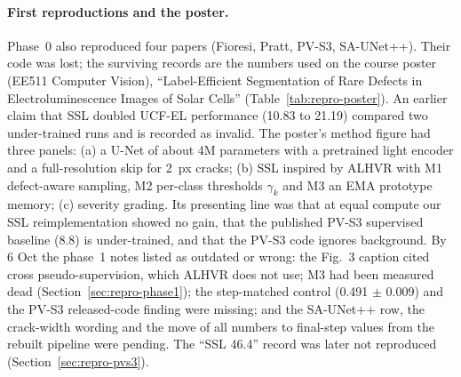 \paragraph{First reproductions and the poster.} Phase~0 also reproduced four papers (Fioresi, Pratt, PV-S3, SA-UNet++). Their code was
lost; the surviving records are the numbers used on the course poster (EE511 Computer Vision), ``Label-Efficient Segmentation of
Rare Defects in Electroluminescence Images of Solar Cells'' (Table~\ref{tab:repro-poster}). An earlier claim that SSL doubled UCF-EL
performance (10.83 to 21.19) compared two under-trained runs and is recorded as invalid. The poster's method figure had three panels: (a) a
U-Net of about 4M parameters with a pretrained light encoder and a full-resolution skip for 2~px cracks; (b) SSL inspired by ALHVR
\citep{lei2025alhvr} with M1 defect-aware sampling, M2 per-class thresholds $\gamma_k$ and M3 an EMA prototype memory; (c) severity
grading. Its presenting line was that at equal compute our SSL reimplementation showed no gain, that the published PV-S3 supervised
baseline (8.8) is under-trained, and that the PV-S3 code ignores background. By 6 Oct the phase~1 notes listed as outdated or wrong: the
Fig.~3 caption cited cross pseudo-supervision, which ALHVR does not use; M3 had been measured dead (Section~\ref{sec:repro-phase1}); the
step-matched control (0.491 $\pm$ 0.009) and the PV-S3 released-code finding were missing; and the SA-UNet++ row, the crack-width
wording and the move of all numbers to final-step values from the rebuilt pipeline were pending. The ``SSL 46.4'' record was later not reproduced
(Section~\ref{sec:repro-pvs3}).


